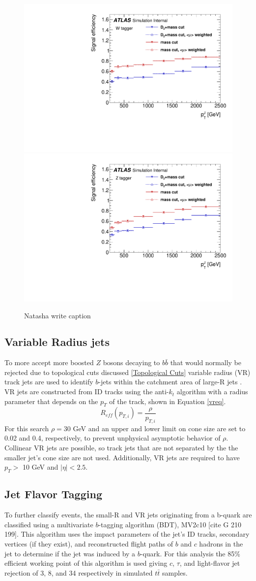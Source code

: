 \begin{figure}[h!]
  \centering
  \includegraphics[width=0.48\hsize]{figures/Analysis/sigeffW.pdf}
  \includegraphics[width=0.48\hsize]{figures/Analysis/sigeffZ.pdf}
  \caption{Natasha write caption} 
  \label{fig:boson_tagger_optimization}
\end{figure} 
\FloatBarrier

\subsection{Variable Radius jets}
To more accept more boosted $Z$ bosons decaying to $b\bar{b}$ that would normally be rejected due to topological cuts discussed \ref{Topological Cuts} variable radius (VR) track jets are used to identify $b$-jets within the catchment area of large-R jets \cite{vrjets}. VR jets are constructed from ID tracks using the anti-$k_{t}$ algorithm with a radius parameter that depends on the $p_{T}$ of the track, shown in Equation \ref{vreq}.
\begin{equation}
R_{eff}(p_{T, i}) = \frac{\rho}{p_{T,i}}
\label{vreq}
\end{equation}
For this search $\rho=30$ GeV and an upper and lower limit on cone size are set to 0.02 and 0.4, respectively, to prevent unphysical asymptotic behavior of $\rho$. Collinear VR jets are possible, so track jets that are not separated by the the smaller jet's cone size are not used. Additionally, VR jets are required to have $p_{T} > $ 10 GeV and $|\eta| < 2.5$. 

\subsection{Jet Flavor Tagging}
To further classify events, the small-R and VR jets originating from a b-quark are classified using a multivariate $b$-tagging algorithm (BDT), MV2c10 [cite G 210 199]. This algorithm uses the impact parameters of the jet's ID tracks, secondary vertices (if they exist), and reconstructed flight paths of $b$ and $c$ hadrons in the jet to determine if the jet was induced by a $b$-quark. For this analysis the 85\% efficient working point of this algorithm is used giving $c$, $\tau$, and light-flavor jet rejection of 3, 8, and 34 respectively in simulated $t\bar{t}$ samples.

